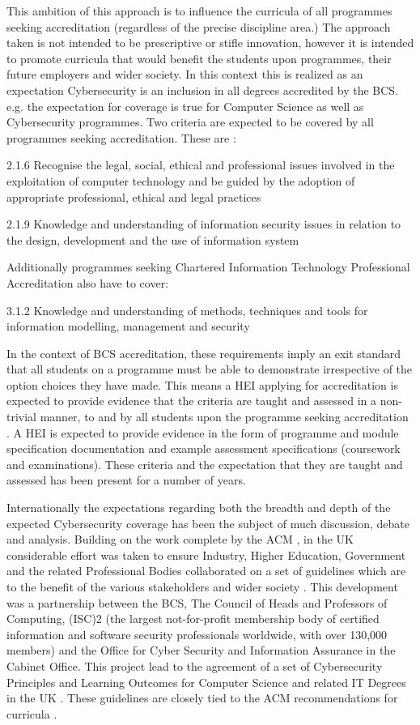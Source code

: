\documentclass[sigconf]{acmart}
\begin{document}
This ambition of this approach is to influence the curricula of all programmes seeking accreditation (regardless of the precise discipline area.)  The approach taken is not intended to be prescriptive or stifle innovation, however it is intended to promote curricula that would benefit the students upon programmes, their future employers and wider society.  In this context this is realized as an expectation Cybersecurity is an inclusion in all degrees accredited by the BCS. e.g. the expectation for coverage is true for Computer Science as well as Cybersecurity programmes. Two criteria are expected to be covered by all programmes seeking accreditation. These are \cite{BCS2018a}:

2.1.6 Recognise the legal, social, ethical and professional issues involved in the exploitation of computer technology and be guided by the adoption of appropriate professional, ethical and legal practices

2.1.9 Knowledge and understanding of information security issues in relation to the design, development and the use of information system

Additionally programmes seeking Chartered Information Technology Professional Accreditation also have to cover:

3.1.2 Knowledge and understanding of methods, techniques and tools for information modelling, management and security

In the context of BCS accreditation, these requirements imply an exit standard that all students on a programme must be able to demonstrate irrespective of the option choices they have made. This means a HEI applying for accreditation is expected to provide evidence that the criteria are taught and assessed in a non-trivial manner, to and by all students upon the programme seeking accreditation . A HEI is expected to provide evidence in the form of programme and module specification documentation and example assessment specifications (coursework and examinations). These criteria and the expectation that they are taught and assessed has been present for a number of years.

Internationally the expectations regarding both the breadth and depth of the expected Cybersecurity coverage has been the subject of much discussion, debate and analysis. Building on the work complete by the ACM \cite{ACM2013a}, in the UK considerable effort was taken to ensure Industry, Higher Education, Government and the related Professional Bodies collaborated on a set of guidelines which are to the benefit of the various stakeholders and wider society \cite{Irons2016}. This development was a partnership between the BCS,  The Council of Heads and Professors of Computing, (ISC)2 (the largest not-for-profit membership body of certified information and software security professionals worldwide, with over 130,000 members) and the Office for Cyber Security and Information Assurance in the Cabinet Office. This project lead to the agreement of a set of Cybersecurity Principles and Learning Outcomes for Computer Science and related IT Degrees in the UK \cite{CPHCISC2}. These guidelines are closely tied to  the ACM recommendations for curricula \cite{ACM2013a}.
\end{document}

